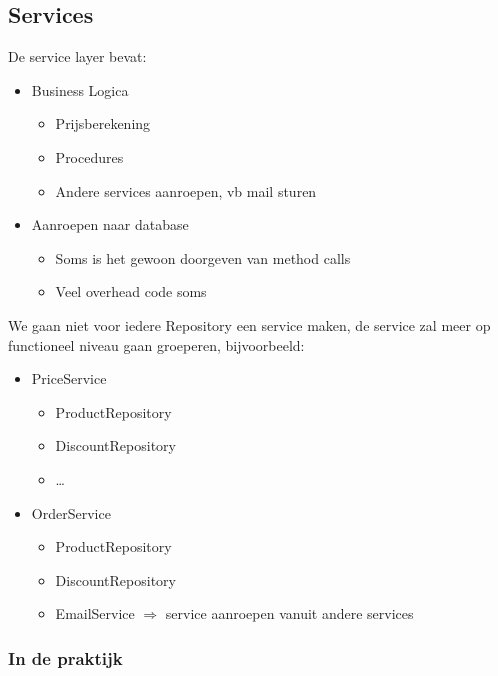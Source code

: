 \documentclass{article}
\begin{document}
\subsection{Services}

De service layer bevat:

\begin{itemize}
    \item Business Logica
    \begin{itemize}
        \item Prijsberekening
        \item Procedures
        \item Andere services aanroepen, vb mail sturen
    \end{itemize}
    \item Aanroepen naar database
    \begin{itemize}
        \item Soms is het gewoon doorgeven van method calls
        \item Veel overhead code soms
    \end{itemize}
\end{itemize}

We gaan niet voor iedere Repository een service maken, de service zal meer op functioneel niveau gaan groeperen, bijvoorbeeld:

\begin{itemize}
    \item PriceService
    \begin{itemize}
        \item ProductRepository
        \item DiscountRepository
        \item \dots
    \end{itemize}
    \item OrderService
    \begin{itemize}
        \item ProductRepository
        \item DiscountRepository
        \item EmailService $\Rightarrow$ service aanroepen vanuit andere services
    \end{itemize}
\end{itemize}

\subsubsection{In de praktijk}
\end{document}
